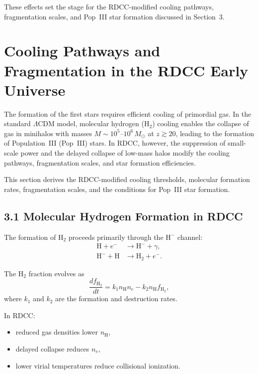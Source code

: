 \documentclass[11pt,a4paper]{article}
\begin{document}
These effects set the stage for the RDCC-modified cooling pathways, fragmentation scales, and 
Pop~III star formation discussed in Section~3.

\section{Cooling Pathways and Fragmentation in the RDCC Early Universe}

The formation of the first stars requires efficient cooling of primordial gas. In the standard 
$\Lambda$CDM model, molecular hydrogen ($\mathrm{H}_2$) cooling enables the collapse of gas in 
minihalos with masses $M \sim 10^{5}$--$10^{6}\,M_{\odot}$ at $z \gtrsim 20$, leading to the 
formation of Population~III (Pop~III) stars. In RDCC, however, the suppression of small-scale 
power and the delayed collapse of low-mass halos modify the cooling pathways, fragmentation 
scales, and star formation efficiencies.

This section derives the RDCC-modified cooling thresholds, molecular formation rates, 
fragmentation scales, and the conditions for Pop~III star formation.

\subsection*{3.1 Molecular Hydrogen Formation in RDCC}

The formation of $\mathrm{H}_2$ proceeds primarily through the $\mathrm{H}^-$ channel:
\begin{align}
    \mathrm{H} + e^- &\rightarrow \mathrm{H}^- + \gamma, \\
    \mathrm{H}^- + \mathrm{H} &\rightarrow \mathrm{H}_2 + e^-.
\end{align}

The $\mathrm{H}_2$ fraction evolves as
\begin{equation}
    \frac{df_{\mathrm{H_2}}}{dt}
    = k_1 n_{\mathrm{H}} n_e
      - k_2 n_{\mathrm{H}} f_{\mathrm{H_2}},
\end{equation}
where $k_1$ and $k_2$ are the formation and destruction rates.

In RDCC:

\begin{itemize}
    \item reduced gas densities lower $n_{\mathrm{H}}$,
    \item delayed collapse reduces $n_e$,
    \item lower virial temperatures reduce collisional ionization.
\end{itemize}
\end{document}
